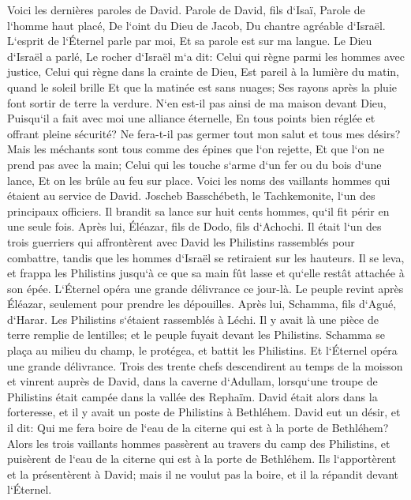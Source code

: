 \verse Voici les dernières paroles de David. Parole de David, fils d`Isaï, Parole de l`homme haut placé, De l`oint du Dieu de Jacob, Du chantre agréable d`Israël. 
\verse L`esprit de l`Éternel parle par moi, Et sa parole est sur ma langue. 
\verse Le Dieu d`Israël a parlé, Le rocher d`Israël m`a dit: Celui qui règne parmi les hommes avec justice, Celui qui règne dans la crainte de Dieu, 
\verse Est pareil à la lumière du matin, quand le soleil brille Et que la matinée est sans nuages; Ses rayons après la pluie font sortir de terre la verdure. 
\verse N`en est-il pas ainsi de ma maison devant Dieu, Puisqu`il a fait avec moi une alliance éternelle, En tous points bien réglée et offrant pleine sécurité? Ne fera-t-il pas germer tout mon salut et tous mes désirs? 
\verse Mais les méchants sont tous comme des épines que l`on rejette, Et que l`on ne prend pas avec la main; 
\verse Celui qui les touche s`arme d`un fer ou du bois d`une lance, Et on les brûle au feu sur place. 
\verse Voici les noms des vaillants hommes qui étaient au service de David. Joscheb Basschébeth, le Tachkemonite, l`un des principaux officiers. Il brandit sa lance sur huit cents hommes, qu`il fit périr en une seule fois. 
\verse Après lui, Éléazar, fils de Dodo, fils d`Achochi. Il était l`un des trois guerriers qui affrontèrent avec David les Philistins rassemblés pour combattre, tandis que les hommes d`Israël se retiraient sur les hauteurs. 
\verse Il se leva, et frappa les Philistins jusqu`à ce que sa main fût lasse et qu`elle restât attachée à son épée. L`Éternel opéra une grande délivrance ce jour-là. Le peuple revint après Éléazar, seulement pour prendre les dépouilles. 
\verse Après lui, Schamma, fils d`Agué, d`Harar. Les Philistins s`étaient rassemblés à Léchi. Il y avait là une pièce de terre remplie de lentilles; et le peuple fuyait devant les Philistins. 
\verse Schamma se plaça au milieu du champ, le protégea, et battit les Philistins. Et l`Éternel opéra une grande délivrance. 
\verse Trois des trente chefs descendirent au temps de la moisson et vinrent auprès de David, dans la caverne d`Adullam, lorsqu`une troupe de Philistins était campée dans la vallée des Rephaïm. 
\verse David était alors dans la forteresse, et il y avait un poste de Philistins à Bethléhem. 
\verse David eut un désir, et il dit: Qui me fera boire de l`eau de la citerne qui est à la porte de Bethléhem? 
\verse Alors les trois vaillants hommes passèrent au travers du camp des Philistins, et puisèrent de l`eau de la citerne qui est à la porte de Bethléhem. Ils l`apportèrent et la présentèrent à David; mais il ne voulut pas la boire, et il la répandit devant l`Éternel. 
